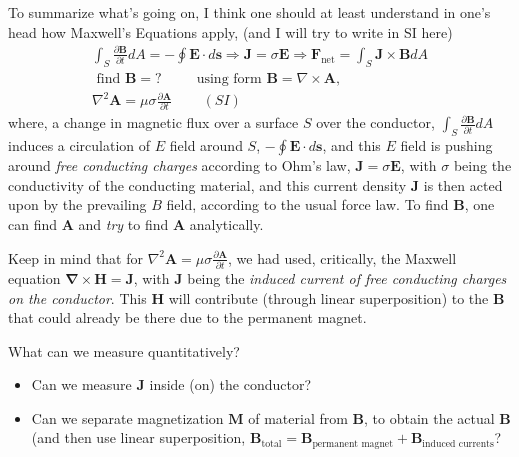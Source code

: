 \documentclass[10pt]{amsart}
\begin{document}
\begin{multicols*}{2}
To summarize what's going on, I think one should at least understand in one's head how Maxwell's Equations apply, (and I will try to write in SI here)
\begin{equation}
\boxed{
\begin{gathered}
\int_S \frac{ \partial \mathbf{B}}{ \partial t} dA = -\oint \mathbf{E}\cdot d\mathbf{s} \Longrightarrow \mathbf{J}=\sigma \mathbf{E} \Longrightarrow \mathbf{F}_{\text{net}} = \int_S \mathbf{J} \times \mathbf{B} dA  \\
\text{ find } \mathbf{B} = ? \qquad \, \text{ using form } \mathbf{B} = \nabla \times \mathbf{A}, \\
\nabla^2 \mathbf{A} = \mu \sigma \frac{ \partial \mathbf{A} }{ \partial t} \qquad \, (SI)
\end{gathered}
}
\end{equation}
where, a change in magnetic flux over a surface $S$ over the conductor, $\int_S \frac{ \partial \mathbf{B}}{ \partial t}dA$ induces a circulation of $E$ field around $S$, $-\oint \mathbf{E} \cdot d\mathbf{s}$, and this $E$ field is pushing around \emph{free conducting charges} according to Ohm's law, $\mathbf{J} = \sigma \mathbf{E}$, with $\sigma$ being the conductivity of the conducting material, and this current density $\mathbf{J}$ is then acted upon by the prevailing $B$ field, according to the usual force law.  To find $\mathbf{B}$, one can find $\mathbf{A}$ and \emph{try} to find $\mathbf{A}$ analytically.  

Keep in mind that for $\nabla^2 \mathbf{A} = \mu \sigma \frac{ \partial \mathbf{A}}{ \partial t}$, we had used, critically, the Maxwell equation $\mathbf{\nabla} \times \mathbf{H} = \mathbf{J}$, with $\mathbf{J}$ being the \emph{induced current of free conducting charges on the conductor}.  This $\mathbf{H}$ will contribute (through linear superposition) to the $\mathbf{B}$ that could already be there due to the permanent magnet.  

What can we measure quantitatively?
\begin{itemize}
\item Can we measure $\mathbf{J}$ inside (on) the conductor?
\item Can we separate magnetization $\mathbf{M}$ of material from $\mathbf{B}$, to obtain the actual $\mathbf{B}$ (and then use linear superposition, $\mathbf{B}_{\text{total}} = \mathbf{B}_{\text{permanent magnet}} + \mathbf{B}_{\text{induced currents}}$? 
\end{itemize}


\end{multicols*}
\end{document}
